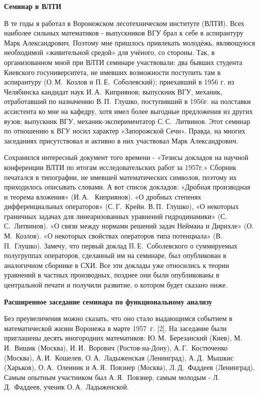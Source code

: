 {\bf Семинар в ВЛТИ}

В те годы я работал в Воронежском лесотехническом институте (ВЛТИ).
Всех наиболее сильных математиков - выпускников ВГУ брал к себе в аспирантуру Марк Александрович.
Поэтому мне пришлось привлекать молодёжь, являющуюся необходимой «живительной средой» для учёного, со стороны.
Так, в организованном мной при ВЛТИ семинаре участвовали:
два бывших студента Киевского госуниверситета, не имевших возможности поступить там в аспирантуру
(О.\,М.~Козлов и П.\,Е.~Соболевский); приехавший в 1956 г. из Челябинска кандидат наук И.\,А.~Киприянов;
выпускник ВГУ, механик, отработавший по назначению В.\,П.~Глушко, поступивший в 1956г. на полставки ассистента ко мне на кафедру,
хотя имел более выгодные предложения из других вузов; выпускник ВГУ, механик-экспериментатор С.\,С.~Литвинов. Этот семинар по отношению к ВГУ носил характер «Запорожской Сечи». Правда, на многих заседаниях присутствовал и активно в них участвовал Марк Александрович.

Сохранился интересный документ того времени - «Тезисы докладов на научной конференции ВЛТИ по итогам исследовательских работ за 1957г.» Сборник печатался в типографии, не имевшей математических символов, поэтому их приходилось описывать словами. А вот список докладов: «Дробная производная и теорема вложения» (И.\,А.~ Киприянов). «О дробных степенях дифференциальных операторов» (С.\,Г.~Крейн. В.\,П.~Глушко), «О некоторых граничных задачах для линеаризованных уравнений гидродинамики» (С.\,С.~Литвинов). «О связи между нормами решений задач Неймана и Дирихле» (О.\,М.~Козлов). «О некоторых свойствах операторов типа потенциала» (В.\,П.~Глушко). Замечу, что первый доклад П.\,Е.~Соболевского о суммируемых полугруппах операторов, сделанный им на семинаре, был опубликован в аналогичном сборнике в СХИ. Все эти доклады уже относились к теории уравнений в частных производных, позднее они были опубликованы в центральной печати и получили развитие, о котором будет сказано ниже.

{\bf Расширенное заседание семинара по фу\-н\-к\-ци\-о\-на\-ль\-но\-му анализу}

Без преувеличения можно сказать, что оно стало выдающимся событием в математической жизни Воронежа в марте 1957~г. [2].
На заседание были приглашены десять иногородних математиков:
Ю.\,М.~Березанский (Киев),
М.\,И.~Ви\-шик (Москва), И.\,И.~Ворович (Ростов-на-Дону), А.\,Г.~Костюченко (Москва), А.\,И.~Кошелев,
О.\,А.~Ладыженская (Ленинград), А.\,Д.~Мышкис (Харьков), О.\,А.~Олеиник и
\linebreak
А.\,Я.~По\-в\-з\-нер (Москва),
Л.\,Д.~Фаддеев (Ленинград).
Самым опытным участником был А.\,Я.~Повзнер, самым молодым - Л.\,Д.~Фаддеев, ученик О.\,А.~Ладыженской.

